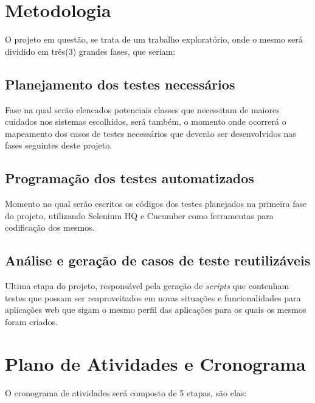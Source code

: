 \documentclass[12pt]{article}
\begin{document}
	\section{Metodologia}

	O projeto em questão, se trata de um trabalho exploratório, onde o mesmo será dividido em três(3) grandes fases, que seriam:

	\subsection{Planejamento dos testes necessários}
	Fase na qual serão elencados potenciais classes que necessitam de maiores cuidados nos sistemas escolhidos, será também, o momento onde ocorrerá o mapeamento dos casos de testes necessários que deverão ser
	desenvolvidos nas fases seguintes deste projeto.

	\subsection{Programação dos testes automatizados}
	Momento no qual serão escritos os códigos dos testes planejados na primeira fase do projeto, utilizando Selenium HQ e Cucumber como ferramentas para codificação dos mesmos.

    \subsection{Análise e geração de casos de teste reutilizáveis}
    Ultima etapa do projeto, responsável pela geração de \emph{scripts} que contenham testes que possam ser reaproveitados em novas situações e funcionalidades para aplicações web que sigam o mesmo perfil das
    aplicações para os quais os mesmos foram criados.

	\section{Plano de Atividades e Cronograma}

	O cronograma de atividades será composto de 5 etapas, são elas:
	
\end{document}
